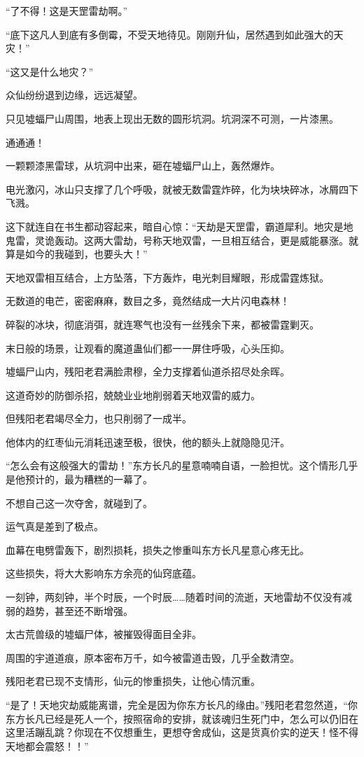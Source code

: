 \begin{this_body}
“了不得！这是天罡雷劫啊。”

“底下这凡人到底有多倒霉，不受天地待见。刚刚升仙，居然遇到如此强大的天灾！”

“这又是什么地灾？”

众仙纷纷退到边缘，远远凝望。

只见墟蝠尸山周围，地表上现出无数的圆形坑洞。坑洞深不可测，一片漆黑。

通通通！

一颗颗漆黑雷球，从坑洞中出来，砸在墟蝠尸山上，轰然爆炸。

电光激闪，冰山只支撑了几个呼吸，就被无数雷霆炸碎，化为块块碎冰，冰屑四下飞溅。

这下就连自在书生都动容起来，暗自心惊：“天劫是天罡雷，霸道犀利。地灾是地鬼雷，灵诡轰动。这两大雷劫，号称天地双雷，一旦相互结合，更是威能暴涨。就算是如今的我碰到，也要头大！”

天地双雷相互结合，上方坠落，下方轰炸，电光刺目耀眼，形成雷霆炼狱。

无数道的电芒，密密麻麻，数目之多，竟然结成一大片闪电森林！

碎裂的冰块，彻底消弭，就连寒气也没有一丝残余下来，都被雷霆剿灭。

末日般的场景，让观看的魔道蛊仙们都一一屏住呼吸，心头压抑。

墟蝠尸山内，残阳老君满脸肃穆，全力支撑着仙道杀招尽处余晖。

这道奇妙的防御杀招，兢兢业业地削弱着天地双雷的威力。

但残阳老君竭尽全力，也只削弱了一成半。

他体内的红枣仙元消耗迅速至极，很快，他的额头上就隐隐见汗。

“怎么会有这般强大的雷劫！”东方长凡的星意喃喃自语，一脸担忧。这个情形几乎是他预计的，最为糟糕的一幕了。

不想自己这一次夺舍，就碰到了。

运气真是差到了极点。

血幕在电劈雷轰下，剧烈损耗，损失之惨重叫东方长凡星意心疼无比。

这些损失，将大大影响东方余亮的仙窍底蕴。

一刻钟，两刻钟，半个时辰，一个时辰……随着时间的流逝，天地雷劫不仅没有减弱的趋势，甚至还不断增强。

太古荒兽级的墟蝠尸体，被摧毁得面目全非。

周围的宇道道痕，原本密布万千，如今被雷道击毁，几乎全数清空。

残阳老君已现不支情形，仙元的惨重损失，让他心情沉重。

“是了！天地灾劫威能离谱，完全是因为你东方长凡的缘由。”残阳老君忽然道，“你东方长凡已经是死人一个，按照宿命的安排，就该魂归生死门中，怎么可以仍旧在这里活蹦乱跳？你现在不仅想重生，更想夺舍成仙，这是货真价实的逆天！怪不得天地都会震怒！！”


\end{this_body}
